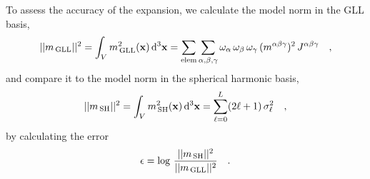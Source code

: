 \documentclass[extra,mreferee]{gji}
\begin{document}
To assess the accuracy of the expansion,
we calculate the model norm in the GLL basis,
\begin{equation}
    ||m_\text{\,GLL}||^2=\int_V m_\text{\,GLL}^2(\mathbf{x})\,\mathrm{d}^3\mathbf{x}=
    \sum_{\mathrm{elem}}\sum_{\alpha,\beta,\gamma}\omega_\alpha\,\omega_\beta\,\omega_\gamma\,(m^{\alpha\beta\gamma})^2\,J^{\alpha\beta\gamma}
    \quad ,
\end{equation}
and compare it to the model norm in the spherical harmonic basis,
\begin{equation}
    ||m_\text{\,SH}||^2=\int_V m_\text{\,SH}^2(\mathbf{x})\,\mathrm{d}^3\mathbf{x}=
    \sum_{\ell = 0}^L(2\ell+1)\,\sigma_\ell^2
    \quad ,
\end{equation}
by calculating the error
\begin{equation}
    \epsilon = \log\,\frac{||m_\text{\,SH}||^2}{||m_\text{\,GLL}||^2}
    \quad .
\end{equation}

\newpage



\end{document}
